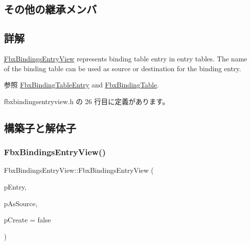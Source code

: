 \subsection*{その他の継承メンバ}


\subsection{詳解}
\hyperlink{class_fbx_bindings_entry_view}{Fbx\+Bindings\+Entry\+View} represents binding table entry in entry tables. The name of the binding table can be used as source or destination for the binding entry. \begin{DoxySeeAlso}{参照}
\hyperlink{class_fbx_binding_table_entry}{Fbx\+Binding\+Table\+Entry} and \hyperlink{class_fbx_binding_table}{Fbx\+Binding\+Table}. 
\end{DoxySeeAlso}


 fbxbindingsentryview.\+h の 26 行目に定義があります。



\subsection{構築子と解体子}
\mbox{\label{class_fbx_bindings_entry_view_a9ed299bf864d23bf17b1ab1d16a1d3d6}} 
\subsubsection{\texorpdfstring{Fbx\+Bindings\+Entry\+View()}{FbxBindingsEntryView()}}
{\footnotesize\ttfamily Fbx\+Bindings\+Entry\+View\+::\+Fbx\+Bindings\+Entry\+View (\begin{DoxyParamCaption}\item[{\hyperlink{class_fbx_binding_table_entry}{Fbx\+Binding\+Table\+Entry} $\ast$}]{p\+Entry,  }\item[{bool}]{p\+As\+Source,  }\item[{bool}]{p\+Create = {\ttfamily false} }\end{DoxyParamCaption})}

